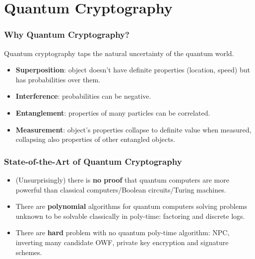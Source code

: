 \section{Quantum Cryptography}
\begin{frame}\frametitle{Why Quantum Cryptography?}
Quantum cryptography taps the natural uncertainty of the quantum world.
\begin{itemize}
\item \textbf{Superposition}: object doesn't have definite properties (location, speed) but has probabilities over them.
\item \textbf{Interference}: probabilities can be negative.
\item \textbf{Entanglement}: properties of many particles can be correlated.
\item \textbf{Measurement}: object's properties collapse to definite value when measured, collapsing also properties of other entangled objects.
\end{itemize}
\end{frame}
\begin{frame}\frametitle{State-of-the-Art of Quantum Cryptography}
\begin{itemize}
\item (Unsurprisingly) there is \textbf{no proof} that quantum computers are more powerful than classical computers/Boolean circuits/Turing machines.
\item There are \textbf{polynomial} algorithms for quantum computers solving problems unknown to be solvable classically in poly-time: factoring and discrete logs.
\item There are \textbf{hard} problem with no quantum poly-time algorithm: NPC, inverting many candidate OWF, private key encryption and signature schemes.
\end{itemize}
\end{frame}
